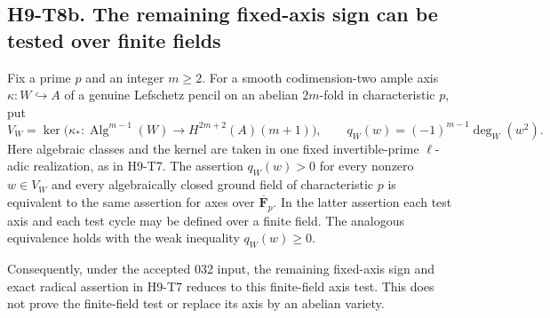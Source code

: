 \subsection*{H9-T8b. The remaining fixed-axis sign can be tested over finite fields}

\begin{proposition}[H9-T8b]
Fix a prime $p$ and an integer $m\ge2$. For a smooth
codimension-two ample axis $\kappa:W\hookrightarrow A$ of a
genuine Lefschetz pencil on an abelian $2m$-fold in
characteristic $p$, put
\[
 V_W=\ker\bigl(\kappa_*:\operatorname{Alg}^{m-1}(W)
                    \longrightarrow H^{2m+2}(A)(m+1)\bigr),
 \qquad q_W(w)=(-1)^{m-1}\deg_W(w^2).
                                                        \tag{H9.8b.1}
\]
Here algebraic classes and the kernel are taken in one fixed
invertible-prime $\ell$-adic realization, as in H9-T7.
The assertion $q_W(w)>0$ for every nonzero $w\in V_W$ and
every algebraically closed ground field of characteristic $p$
is equivalent to the same assertion for axes over
$\overline{\mathbf F}_p$. In the latter assertion each test
axis and each test cycle may be defined over a finite field.
The analogous equivalence holds with the weak inequality
$q_W(w)\ge0$.

Consequently, under the accepted 032 input, the remaining fixed-axis sign and exact
radical assertion in H9-T7 reduces to this finite-field axis
test. This does not prove the finite-field test or replace its
axis by an abelian variety.
\end{proposition}

